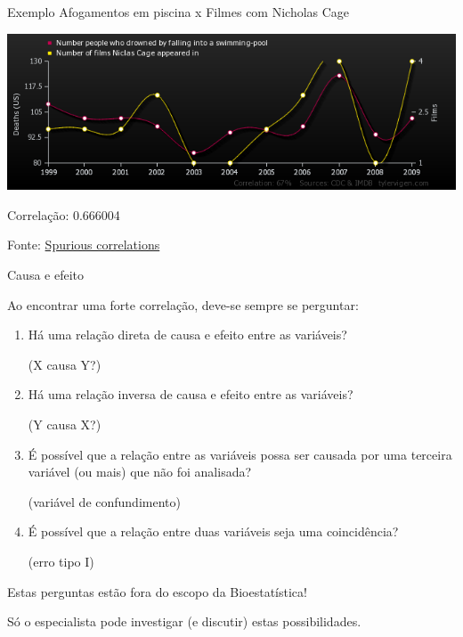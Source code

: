 \documentclass{beamer}
\begin{document}
\begin{frame}{\scriptsize Exemplo}
  \scriptsize
  Afogamentos em piscina x Filmes com Nicholas Cage
  \bigskip

  \includegraphics[width=\textwidth]{Cap17/number-people-who-drowned-by-falling-into-a-swimming-pool_number-of-films-niclas-cage-appeared-in}

  \bigskip
  Correlação: 0.666004

  \vfill
  \hfill \tiny Fonte: \href{https://www.tylervigen.com/spurious-correlations}{Spurious correlations}
\end{frame}


\begin{frame}{\scriptsize Causa e efeito}

  {\scriptsize
    Ao encontrar uma forte correlação, deve-se sempre se perguntar:
  }
  \bigskip

  \begin{enumerate}
    \scriptsize
  \item Há uma relação direta de causa e efeito entre as variáveis?

    {\tiny (X causa Y?)}
    \bigskip
  \item Há uma relação inversa de causa e efeito entre as variáveis?

    {\tiny (Y causa X?)}
    \bigskip
  \item É possível que a relação entre as variáveis possa ser causada
    por uma terceira variável (ou mais) que não foi analisada?

    {\tiny (variável de confundimento)}
    \bigskip
  \item É possível que a relação entre duas variáveis seja uma
    coincidência?

    {\tiny (erro tipo I)}
  \end{enumerate}
  \vfill
  \begin{block}{}
    \scriptsize
    Estas perguntas estão fora do escopo da Bioestatística!

    \bigskip
    Só o especialista pode investigar (e discutir) estas possibilidades.
  \end{block}
\end{frame}
\end{document}
